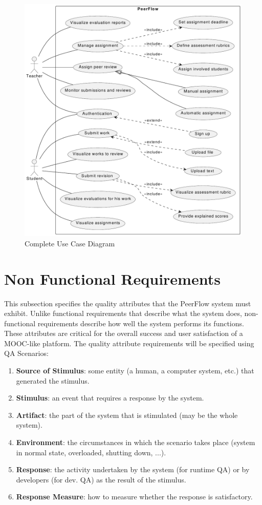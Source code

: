 \begin{figure}[h]
    \centering
    \includegraphics[width=0.9\linewidth]{SRS/imgs/GeneralUseCase.pdf}
    \caption{Complete Use Case Diagram}
    \label{fig:GeneralUseCase}
\end{figure}

\clearpage

\section{Non Functional Requirements}

\begin{justify}
    This subsection specifies the quality attributes that the PeerFlow system must exhibit. Unlike functional requirements that describe what the system does, non-functional requirements describe how well the system performs its functions. These attributes are critical for the overall success and user satisfaction of a MOOC-like platform.
    The quality attribute requirements will be specified using QA Scenarios:
    \begin{enumerate}
        \item \textbf{Source of Stimulus}: some entity (a human, a computer system, etc.) that generated the stimulus.
        \item \textbf{Stimulus}: an event that requires a response by the system.
        \item \textbf{Artifact}: the part of the system that is stimulated (may be the whole system).
        \item \textbf{Environment}: the circumstances in which the scenario takes place (system in normal state, overloaded, shutting down, ...).
        \item \textbf{Response}: the activity undertaken by the system (for runtime QA) or by developers (for dev. QA) as the result of the stimulus.
        \item \textbf{Response Measure}:  how to measure whether the response is satisfactory.
    \end{enumerate}
\end{justify}

